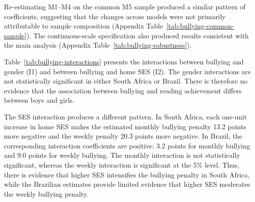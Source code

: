 Re-estimating M1–M4 on the common M5 sample produced a similar pattern of coefficients, suggesting that the changes across models were not primarily attributable to sample composition (Appendix Table~\ref{tab:bullying-common-sample}). The continuous-scale specification also produced results consistent with the main analysis (Appendix Table~\ref{tab:bullying-robustness}).

Table~\ref{tab:bullying-interactions} presents the interactions between bullying and gender (I1) and between bullying and home SES (I2). The gender interactions are not statistically significant in either South Africa or Brazil. There is therefore no evidence that the association between bullying and reading achievement differs between boys and girls.

The SES interaction produces a different pattern. In South Africa, each one-unit increase in home SES makes the estimated monthly bullying penalty 13.2 points more negative and the weekly penalty 20.3 points more negative. In Brazil, the corresponding interaction coefficients are positive: 3.2 points for monthly bullying and 9.0 points for weekly bullying. The monthly interaction is not statistically significant, whereas the weekly interaction is significant at the 5\% level. Thus, there is evidence that higher SES intensifies the bullying penalty in South Africa, while the Brazilian estimates provide limited evidence that higher SES moderates the weekly bullying penalty.


\FloatBarrier
